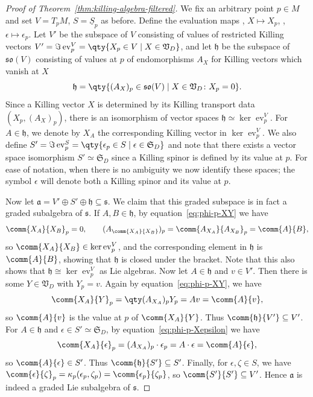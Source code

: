 \documentclass[pdftex]{sigma}
\numberwithin{equation}{section}
\newcommand{\fa}{\mathfrak{a}}
\newcommand{\fh}{\mathfrak{h}}
\newcommand{\fs}{\mathfrak{s}}
\newcommand{\fso}{\mathfrak{so}}
\newcommand{\fS}{\mathfrak{S}}
\newcommand{\fV}{\mathfrak{V}}
\newcommand{\Sbundle}{\underline{S}}
\newcommand{\1}{\mathbbm{1}}
\DeclareMathOperator{\evaluate}{ev}
\begin{document}
\begin{proof}[Proof of Theorem~\ref{thm:killing-algebra-filtered}]	
	We fix an arbitrary point $p\in M$ and set $V=T_pM$, $S=\Sbundle_p$ as before. Define the evaluation maps
\smash{$\evaluate^V_p\colon \fV_D \to V$}, $X\mapsto X_p$,
\smash{$\evaluate^S_p\colon \fS_D \to S$}, $\epsilon\mapsto \epsilon_p$.
	Let $V'$ be the subspace of $V$ consisting of values of restricted Killing vectors
$V' = \Im\evaluate^V_p = \qty{X_p\in V \mid X\in\fV_D }$,
	and let $\fh$ be the subspace of $\fso(V)$ consisting of values at $p$ of endomorphisms $A_X$ for Killing vectors which vanish at $X$
	\[
		\fh = \qty{(A_X)_p\in\fso(V) \mid X\in\fV_D\colon X_p=0}.
	\]
	Since a Killing vector $X$ is determined by its Killing transport data $(X_p,(A_X)_p)$, there is an isomorphism of vector spaces $\fh\simeq \ker\evaluate^V_p$. For $A\in\fh$, we denote by $X_A$ the corresponding Killing vector in $\ker\evaluate^V_p$. We also define
$S' = \Im\evaluate^S_p = \qty{\epsilon_p\in S \mid \epsilon\in\fS_D}
$
	and note that there exists a vector space isomorphism $S'\simeq \fS_D$ since a Killing spinor is defined by its value at $p$. For ease of notation, when there is no ambiguity we now identify these spaces; the symbol $\epsilon$ will denote both a Killing spinor and its value at $p$.
	
	Now let $\fa = V'\oplus S'\oplus\fh \subseteq \fs$. We claim that this graded subspace is in fact a graded subalgebra of $\fs$. If $A,B\in\fh$, by equation~\eqref{eq:phi-p-XY} we have
	\begin{gather*}
		\comm{X_A}{X_B}_p = 0,\qquad
		(A_{\comm{X_A}{X_B}})_p = \comm{A_{X_A}}{A_{X_B}}_p = \comm{A}{B},
	\end{gather*}
	so $\comm{X_A}{X_B}\in\ker\evaluate^V_p$, and the corresponding element in $\fh$ is $\comm{A}{B}$, showing that $\fh$ is closed under the bracket. Note that this also shows that $\fh\cong\ker\evaluate^V_p$ as Lie algebras. Now let $A\in\fh$ and $v\in V'$. Then there is some $Y\in\fV_D$ with $Y_p=v$. Again by equation~\eqref{eq:phi-p-XY}, we have
	\[
		\comm{X_A}{Y}_p = \qty(A_{X_A})_p Y_p = A v = \comm{A}{v},
	\]
	so $\comm{A}{v}$ is the value at $p$ of $\comm{X_A}{Y}$. Thus $\comm{\fh}{V'}\subseteq V'$. For $A\in\fh$ and $\epsilon\in S'\simeq\fS_D$, by equation~\eqref{eq:phi-p-Xepsilon} we have
	\[
		\comm{X_A}{\epsilon}_p = (A_{X_A})_p\cdot\epsilon_p = A\cdot\epsilon = \comm{A}{\epsilon},
	\]
	so $\comm{A}{\epsilon}\in S'$. Thus $\comm{\fh}{S'}\subseteq S'$. Finally, for $\epsilon,\zeta\in S$, we have
$\comm{\epsilon}{\zeta}_p
			= \kappa_p(\epsilon_p,\zeta_p)
			= \comm{\epsilon_p}{\zeta_p}$,
	so $\comm{S'}{S'}\subseteq V'$. Hence $\fa$ is indeed a graded Lie subalgebra of $\fs$.
	

\end{proof}
\end{document}
